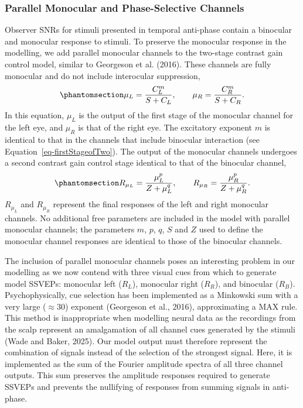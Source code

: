 \documentclass[
  12pt,
]{article}
\begin{document}
\subsubsection{Parallel Monocular and Phase-Selective
Channels}\label{parallel-monocular-and-phase-selective-channels}

Observer SNRs for stimuli presented in temporal anti-phase contain a
binocular and monocular response to stimuli. To preserve the monocular
response in the modelling, we add parallel monocular channels to the
two-stage contrast gain control model, similar to Georgeson et al.
(2016). These channels are fully monocular and do not include
interocular suppression,
\begin{equation}\phantomsection\label{eq-monocFirstStage}{
\mu_L = \frac{C_L^m}{S + C_L}, \qquad  \mu_R = \frac{C_R^m}{S + C_R}.
}\end{equation} In this equation, \(\mu_L\) is the output of the first
stage of the monocular channel for the left eye, and \(\mu_R\) is that
of the right eye. The excitatory exponent \(m\) is identical to that in
the channels that include binocular interaction (see
Equation~\ref{eq-firstStageofTwo}). The output of the monocular channels
undergoes a second contrast gain control stage identical to that of the
binocular channel,
\begin{equation}\phantomsection\label{eq-monocSecondStage}{
R_{\mu_L} = \frac{\mu_L^p}{Z + \mu_L^q}, \qquad  R_{\mu_R} = \frac{\mu_R^p}{Z + \mu_R^q}.
}\end{equation} \(R_{\mu_L}\) and \(R_{\mu_R}\) represent the final
responses of the left and right monocular channels. No additional free
parameters are included in the model with parallel monocular channels;
the parameters \(m\), \(p\), \(q\), \(S\) and \(Z\) used to define the
monocular channel responses are identical to those of the binocular
channels.

The inclusion of parallel monocular channels poses an interesting
problem in our modelling as we now contend with three visual cues from
which to generate model SSVEPs: monocular left (\(R_L\)), monocular
right (\(R_R\)), and binocular (\(R_B\)). Psychophysically, cue
selection has been implemented as a Minkowski sum with a very large
(\(\approx 30\)) exponent (Georgeson et al., 2016), approximating a MAX
rule. This method is inappropriate when modelling neural data as the
recordings from the scalp represent an amalgamation of all channel cues
generated by the stimuli (Wade and Baker, 2025). Our model output must
therefore represent the combination of signals instead of the selection
of the strongest signal. Here, it is implemented as the sum of the
Fourier amplitude spectra of all three channel outputs. This sum
preserves the amplitude responses required to generate SSVEPs and
prevents the nullifying of responses from summing signals in anti-phase.
\end{document}

